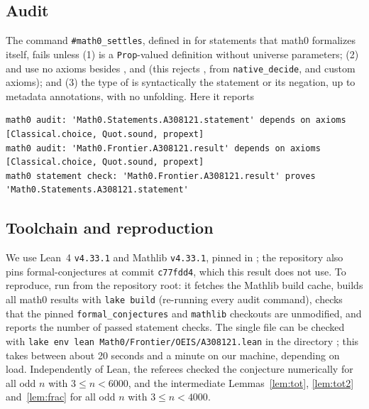 \documentclass[11pt]{amsart}
\theoremstyle{plain}
\theoremstyle{definition}
\begin{document}
\subsection*{Audit}
The command \texttt{\#math0\_settles}, defined in  for statements that math0 formalizes itself, fails unless (1)  is a \texttt{Prop}-valued definition without universe parameters; (2)  and  use no axioms besides ,  and  (this rejects ,  from \texttt{native\_decide}, and custom axioms); and (3) the type of  is syntactically the statement or its negation, up to metadata annotations, with no unfolding. Here it reports
\begin{lstlisting}[basicstyle=\ttfamily\scriptsize]
math0 audit: 'Math0.Statements.A308121.statement' depends on axioms [Classical.choice, Quot.sound, propext]
math0 audit: 'Math0.Frontier.A308121.result' depends on axioms [Classical.choice, Quot.sound, propext]
math0 statement check: 'Math0.Frontier.A308121.result' proves 'Math0.Statements.A308121.statement'
\end{lstlisting}

\subsection*{Toolchain and reproduction}
We use Lean~4 \cite{Lean4} \texttt{v4.33.1} and Mathlib \cite{Mathlib} \texttt{v4.33.1}, pinned in ; the repository also pins formal-conjectures \cite{FC} at commit \texttt{c77fdd4}, which this result does not use.
To reproduce, run  from the repository root: it fetches the Mathlib build cache, builds all math0 results with \texttt{lake build} (re-running every audit command), checks that the pinned \texttt{formal\_conjectures} and \texttt{mathlib} checkouts are unmodified, and reports the number of passed statement checks. The single file can be checked with \texttt{lake env lean Math0/Frontier/OEIS/A308121.lean} in the directory ; this takes between about 20 seconds and a minute on our machine, depending on load.
Independently of Lean, the referees checked the conjecture numerically for all odd $n$ with $3\le n<6000$, and the intermediate Lemmas~\ref{lem:tot}, \ref{lem:tot2} and~\ref{lem:frac} for all odd $n$ with $3\le n<4000$.
\end{document}
